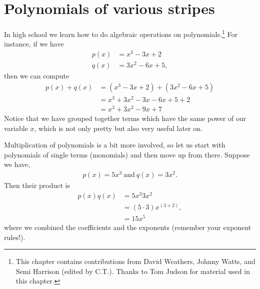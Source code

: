 

 
\section{Polynomials of various stripes}
In high school we learn how to do algebraic operations on polynomials.\footnote{This chapter contains contributions from David Weathers, Johnny Watts, and Semi Harrison (edited by C.T.). Thanks to Tom Judson for material used in this chapter.} For instance, if we have
\begin{align*} 
p(x) & = x^3 -3x +2 \\
q(x) & = 3x^2 -6x +5,
\end{align*}
then we can compute 
\begin{align*}
p(x) + q(x) 
& =  ( x^3 - 3 x + 2 ) + ( 3 x^2 - 6 x + 5 ) \\
& = x^3 + 3x^2 - 3x - 6x + 5 + 2\\
& = x^3 + 3 x^2 - 9 x + 7
\end{align*}
Notice that we have grouped together terms which have the same power of our variable $x$, which is not only pretty but also very useful later on.  

Multiplication of polynomials is a bit more involved, so let us start with polynomials of single terms (monomials) and then move up from there.  Suppose we have,
\begin{align*} 
p(x)  = 5x^3~\text{and}~  
q(x)  = 3x^2.
\end{align*}
Then their product is
\begin{align*}
p(x)  q(x) 
& =  5x^3 3 x^2 \\
& = (5 \cdot 3)x^{(3 + 2)},\\
& = 15x^5
\end{align*}
where we combined the coefficients and the exponents (remember your exponent rules!).  

